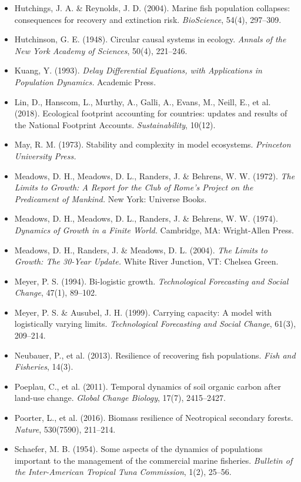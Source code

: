 \documentclass[11pt]{article}
\begin{document}
\begin{itemize}
\item Hutchings, J. A. \& Reynolds, J. D. (2004). Marine fish population collapses: consequences for recovery and extinction risk. \emph{BioScience}, 54(4), 297–309.
\item Hutchinson, G. E. (1948). Circular causal systems in ecology. \emph{Annals of the New York Academy of Sciences}, 50(4), 221–246.
\item Kuang, Y. (1993). \emph{Delay Differential Equations, with Applications in Population Dynamics.} Academic Press.
\item Lin, D., Hanscom, L., Murthy, A., Galli, A., Evans, M., Neill, E., et al. (2018). Ecological footprint accounting for countries: updates and results of the National Footprint Accounts. \emph{Sustainability}, 10(12).
\item May, R. M. (1973). Stability and complexity in model ecosystems. \emph{Princeton University Press.}
\item Meadows, D. H., Meadows, D. L., Randers, J. \& Behrens, W. W. (1972). \emph{The Limits to Growth: A Report for the Club of Rome's Project on the Predicament of Mankind.} New York: Universe Books.
\item Meadows, D. H., Meadows, D. L., Randers, J. \& Behrens, W. W. (1974). \emph{Dynamics of Growth in a Finite World.} Cambridge, MA: Wright-Allen Press.
\item Meadows, D. H., Randers, J. \& Meadows, D. L. (2004). \emph{The Limits to Growth: The 30-Year Update.} White River Junction, VT: Chelsea Green.
\item Meyer, P. S. (1994). Bi-logistic growth. \emph{Technological Forecasting and Social Change}, 47(1), 89–102.
\item Meyer, P. S. \& Ausubel, J. H. (1999). Carrying capacity: A model with logistically varying limits. \emph{Technological Forecasting and Social Change}, 61(3), 209–214.
\item Neubauer, P., et al. (2013). Resilience of recovering fish populations. \emph{Fish and Fisheries}, 14(3).
\item Poeplau, C., et al. (2011). Temporal dynamics of soil organic carbon after land-use change. \emph{Global Change Biology}, 17(7), 2415–2427.
\item Poorter, L., et al. (2016). Biomass resilience of Neotropical secondary forests. \emph{Nature}, 530(7590), 211–214.
\item Schaefer, M. B. (1954). Some aspects of the dynamics of populations important to the management of the commercial marine fisheries. \emph{Bulletin of the Inter-American Tropical Tuna Commission}, 1(2), 25–56.

\end{itemize}
\end{document}
